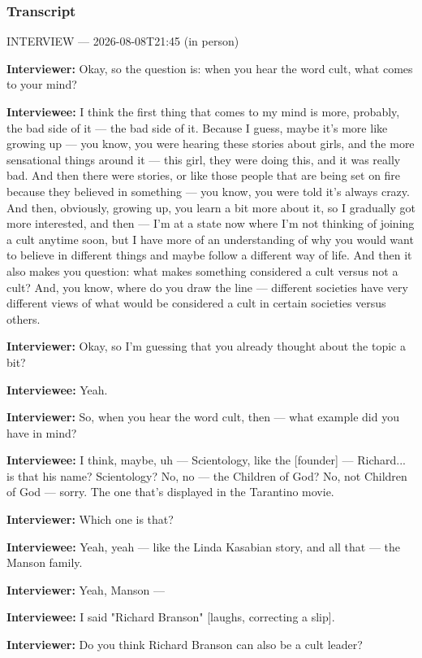 \subsubsection*{Transcript}
INTERVIEW — 2026-08-08T21:45 (in person)

\textbf{Interviewer:} Okay, so the question is: when you hear the word cult, what comes to your mind?

\textbf{Interviewee:} I think the first thing that comes to my mind is more, probably, the bad side of it — the bad side of it. Because I guess, maybe it's more like growing up — you know, you were hearing these stories about girls, and the more sensational things around it — this girl, they were doing this, and it was really bad. And then there were stories, or like those people that are being set on fire because they believed in something — you know, you were told it's always crazy. And then, obviously, growing up, you learn a bit more about it, so I gradually got more interested, and then — I'm at a state now where I'm not thinking of joining a cult anytime soon, but I have more of an understanding of why you would want to believe in different things and maybe follow a different way of life. And then it also makes you question: what makes something considered a cult versus not a cult? And, you know, where do you draw the line — different societies have very different views of what would be considered a cult in certain societies versus others.

\textbf{Interviewer:} Okay, so I'm guessing that you already thought about the topic a bit?

\textbf{Interviewee:} Yeah.

\textbf{Interviewer:} So, when you hear the word cult, then — what example did you have in mind?

\textbf{Interviewee:} I think, maybe, uh — Scientology, like the [founder] — Richard... is that his name?  Scientology? No, no — the Children of God?
  No, not Children of God — sorry. The one that's displayed in the Tarantino movie.

\textbf{Interviewer:} Which one is that?

\textbf{Interviewee:} Yeah, yeah — like the Linda Kasabian story, and all that — the Manson family.

\textbf{Interviewer:} Yeah, Manson —

\textbf{Interviewee:} I said "Richard Branson" [laughs, correcting a slip].

\textbf{Interviewer:} Do you think Richard Branson can also be a cult leader?

